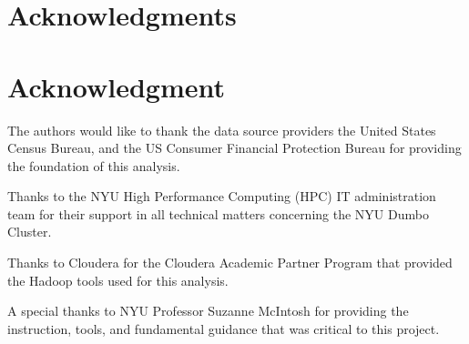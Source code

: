 \documentclass[conference,compsoc]{IEEEtran}
\begin{document}



\ifCLASSOPTIONcompsoc
  \section*{Acknowledgments}
\else
  \section*{Acknowledgment}
\fi


The authors would like to thank the data source providers the United States Census Bureau, and the US Consumer Financial Protection Bureau for providing the foundation of this analysis. 

Thanks to the NYU High Performance Computing (HPC) IT administration team for their support in all technical matters concerning the NYU Dumbo Cluster.

Thanks to Cloudera for the Cloudera Academic Partner Program that provided the Hadoop tools used for this analysis.

A special thanks to NYU Professor Suzanne McIntosh for providing the instruction, tools, and fundamental guidance that was critical to this project.




\end{document}
